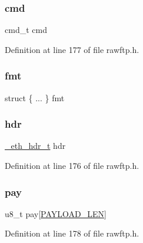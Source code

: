 \subsubsection{\texorpdfstring{cmd}{cmd}}
{\footnotesize\ttfamily cmd\+\_\+t cmd}



Definition at line 177 of file rawftp.\+h.

\hypertarget{unioneth__frame__u_aa60fa70581c95caf169086f9aa7025af}{}\label{unioneth__frame__u_aa60fa70581c95caf169086f9aa7025af} 
\subsubsection{\texorpdfstring{fmt}{fmt}}
{\footnotesize\ttfamily struct \{ ... \}  fmt}

\hypertarget{unioneth__frame__u_a836db811e18860e8adf76cf147200ff5}{}\label{unioneth__frame__u_a836db811e18860e8adf76cf147200ff5} 
\subsubsection{\texorpdfstring{hdr}{hdr}}
{\footnotesize\ttfamily \hyperlink{eth_8c_a602f0f5470a6e6fb2fa3a0e84b1cb58e}{\+\_\+eth\+\_\+hdr\+\_\+t} hdr}



Definition at line 176 of file rawftp.\+h.

\hypertarget{unioneth__frame__u_a41cea27b705531eda8d10d63e814e474}{}\label{unioneth__frame__u_a41cea27b705531eda8d10d63e814e474} 
\subsubsection{\texorpdfstring{pay}{pay}}
{\footnotesize\ttfamily u8\+\_\+t pay\mbox{[}\hyperlink{rawftp_8h_a212a14606599edd2c69298c5cffa64a0}{P\+A\+Y\+L\+O\+A\+D\+\_\+\+L\+EN}\mbox{]}}



Definition at line 178 of file rawftp.\+h.

\hypertarget{unioneth__frame__u_a1bdd89949a8259c99b4e5a7f332290f7}{}\label{unioneth__frame__u_a1bdd89949a8259c99b4e5a7f332290f7} 
